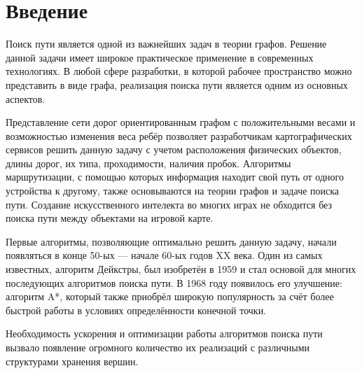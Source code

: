 \section{Введение}
Поиск пути является одной из важнейших задач в теории графов. Решение данной задачи имеет широкое практическое применение в современных технологиях. В любой сфере разработки, в которой рабочее пространство можно представить в виде графа, реализация поиска пути является одним из основных аспектов.

Представление сети дорог ориентированным графом с положительными весами и возможностью изменения веса ребёр позволяет разработчикам картографических сервисов решить данную задачу с учетом расположения физических объектов, длины дорог, их типа, проходимости, наличия пробок. Алгоритмы маршрутизации, с помощью которых информация находит свой путь от одного устройства к другому, также основываются на теории графов и задаче поиска пути. Создание искусственного интелекта во многих играх не обходится без поиска пути между объектами на игровой карте.

Первые алгоритмы, позволяющие оптимально решить данную задачу, начали появляться в конце 50-ых — начале 60-ых годов XX века. Один из самых известных, алгоритм Дейкстры, был изобретён в 1959 и стал основой для многих последующих алгоритмов поиска пути. В 1968 году появилось его улучшение: алгоритм A*, который также приобрёл широкую популярность за счёт более быстрой работы в условиях определённости конечной точки.

Необходимость ускорения и оптимизации работы алгоритмов поиска пути вызвало появление огромного количество их реализаций с различными структурами хранения вершин.
